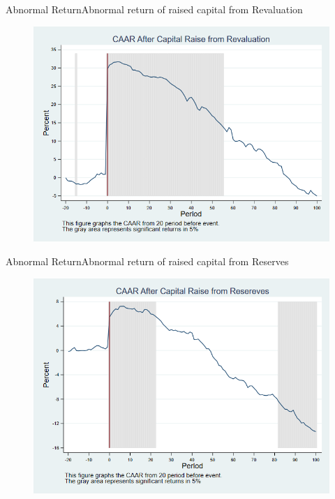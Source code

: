 \documentclass{beamer}
\begin{document}
\begin{frame}{Abnormal Return}{Abnormal return of raised capital from Revaluation}
\label{abreturnrevalution4Factor}
\begin{figure}
\centering
\includegraphics[width=0.65\linewidth]{AbReturnRevalution_4Factor}
\label{fig:abreturnrevalution2}
\end{figure}

\hfill\hyperlink{abreturnrevalution}{}
\end{frame}


\begin{frame}{Abnormal Return}{Abnormal return of raised capital from Reserves}
\label{abreturnsaving4Factor}
\begin{figure}
\centering
\includegraphics[width=0.65\linewidth]{AbReturnSaving_4Factor}
\label{fig:abreturnsaving2}
\end{figure}

\hfill\hyperlink{abreturnsaving}{}
\end{frame}
\end{document}
